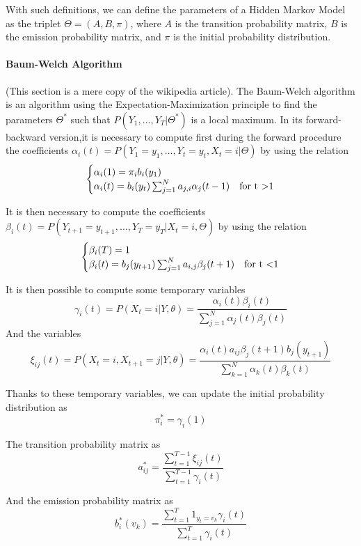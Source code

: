 With such definitions, we can define the parameters of a Hidden Markov Model as the triplet $\Theta = (A, B, \pi)$, where $A$ is the transition probability matrix, $B$ is the emission probability matrix, and $\pi$ is the initial probability distribution.
\paragraph{Baum-Welch Algorithm}
(This section is a mere copy of the wikipedia article).
The Baum-Welch algorithm is an algorithm using the Expectation-Maximization principle to find the parameters $\Theta^*$ such that $P(Y_1,...,Y_T| \Theta^* )$ is a local maximum.
In its forward-backward version,it is necessary to compute first during the forward procedure the coefficients $\alpha_i(t) = P(Y_1=y_1,...,Y_t = y_t, X_t = i | \Theta )$ by using the relation
\begin{equation}
\begin{cases}
\alpha_i(1) = \pi_i b_i(y_1) & \\
\alpha_i(t) = b_i(y_t)\sum_{j=1}^{N}{a_{j,i}\alpha_j(t-1)} & \text{for t \textgreater 1}
\end{cases}
\end{equation}

It is then necessary to compute the coefficients $\beta_i(t) = P(Y_{t+1}=y_{t+1},...,Y_T = y_T| X_t = i, \Theta )$ by using the relation
\begin{equation}
\begin{cases}
\beta_i(T) = 1 & \\
\beta_i(t) = b_j(y_{t+1})\sum_{j=1}^{N}{a_{i,j}\beta_j(t+1)} & \text{for t \textless 1}
\end{cases}
\end{equation}

It is then possible to compute some temporary variables
\[\gamma_i(t)=P(X_t=i|Y,\theta) = \frac{\alpha_i(t)\beta_i(t)}{\sum_{j=1}^N \alpha_j(t)\beta_j(t)}\]
And the variables
\[\xi_{ij}(t)=P(X_t=i,X_{t+1}=j|Y,\theta)=\frac{\alpha_i(t) a_{ij} \beta_j(t+1) b_j(y_{t+1})}{\sum_{k=1}^N \alpha_k(t)  \beta_k(t)}\]

Thanks to these temporary variables, we can update the initial probability distribution as
\[\pi_i^* = \gamma_i(1)\]

The transition probability matrix as
\[a_{ij}^*=\frac{\sum^{T-1}_{t=1}\xi_{ij}(t)}{\sum^{T-1}_{t=1}\gamma_i(t)}\]

And the emission probability matrix as
\[b_i^*(v_k)=\frac{\sum^T_{t=1} 1_{y_t=v_k} \gamma_i(t)}{\sum^T_{t=1} \gamma_i(t)}\]

